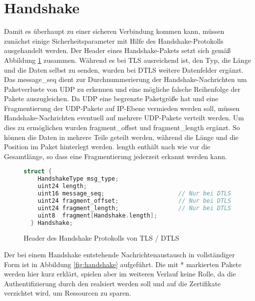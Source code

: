 \section{Handshake}

Damit es überhaupt zu einer sicheren Verbindung kommen kann, müssen zunächst einige Sicherheitsparameter mit Hilfe des Handshake-Protokolls ausgehandelt werden.
Der Header eines Handshake-Pakets setzt sich gemäß Abbildung \ref{fig:handshakelayer} zusammen. Während es bei TLS ausreichend ist, den Typ, die Länge und die Daten selbst
zu senden, wurden bei DTLS weitere Datenfelder ergänzt. Das message\_seq dient zur Durchnummerierung der Handshake-Nachrichten um Paketverluste von UDP zu erkennen
und eine mögliche falsche Reihenfolge der Pakete auszugleichen. Da UDP eine begrenzte Paketgröße hat und eine Fragmentierung der UDP-Pakete auf IP-Ebene
vermieden werden soll, müssen Handshake-Nachrichten eventuell auf mehrere UDP-Pakete verteilt werden. Um dies zu ermöglichen wurden fragment\_offset und fragment\_length
ergänzt. So können die Daten in mehrere Teile geteilt werden, während die Länge und die Position im Paket hinterlegt werden. length enthält nach wie vor die
Gesamtlänge, so dass eine Fragmentierung jederzeit erkannt werden kann.

\begin{figure}[ht]
  \centering
  \begin{lstlisting}[language=c]
  struct {
    HandshakeType msg_type;
    uint24 length;
    uint16 message_seq;                     // Nur bei DTLS
    uint24 fragment_offset;                 // Nur bei DTLS
    uint24 fragment_length;                 // Nur bei DTLS
    uint8  fragment[Handshake.length];
  } Handshake;
  \end{lstlisting}
  \caption{Header des Handshake Protokolls von TLS / DTLS}
  \label{fig:handshakelayer}
\end{figure}

Der bei einem Handshake entstehende Nachrichtenaustausch in vollständiger Form ist in Abbildung \ref{fig:handshake} aufgeführt.
Die mit * markierten Pakete werden hier kurz erklärt, spielen aber im weiteren Verlauf keine Rolle, da die Authentifizierung durch
den  realsiert werden soll und auf die Zertifikate verzichtet wird, um Ressourcen zu sparen.

